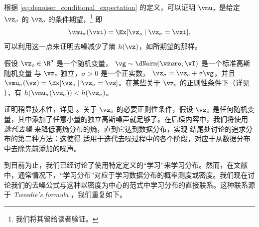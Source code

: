 \documentclass[../../book-main.tex]{subfiles}
\begin{document}
根据 \eqref{eq:denoiser_conditional_expectation} 的定义，可以证明 \(\vmu_{\sigma}\) 是给定 \(\vz_{\sigma}\) 的 \(\vz_{o}\) 的条件期望，\footnote{我们将其留给读者验证。} 即
\begin{equation}
    \vmu_{\sigma}(\vxi) = \Ex[\vz_{o} \mid \vz_{\sigma} = \vxi].
\end{equation}
可以利用这一点来证明去噪减少了熵 \(h(\vz)\)，如所期望的那样。
\begin{theorem}[去噪和熵]\label{thm:conditioning_reduces_entropy}
    假设 \(\vz_{o} \in \R^{d}\) 是一个随机变量，
    \(\vg \sim \dNorm(\vzero, \vI)\) 是一个标准高斯随机变量
    与 \(\vz_{o}\) 独立，\(\sigma > 0\) 是一个正实数，
    \(\vz_{\sigma} = \vz_{o} + \sigma \vg\)，并且 \(\vmu_{\sigma}(\vz)
    = \Ex[\vz_{o} \mid \vz_{\sigma} = \vz]\)。在某些关于 \(\vz_o\) 的正则性条件下（详见 ），有
    \(h(\vmu_{\sigma}(\vz_{\sigma})) < h(\vz_{\sigma})\)。
\end{theorem}
证明稍显技术性，详见 。关于 \(\vz_o\) 的必要正则性条件，假设 \(\vz_o\) 是任何随机变量，其中添加了任意小量的独立高斯噪声就足够了。在后续内容中，我们将使用 \textit{迭代去噪} 来降低高熵分布的熵，直到它达到数据分布，实现  结尾处讨论的追求分布的第二种方法：这使得  适用于迭代去噪过程中的各个阶段，对应于从数据分布中去除先前添加的噪声。

到目前为止，我们已经讨论了使用特定定义的“学习”来学习分布。然而，在文献中，通常情况下，“学习分布”对应于学习数据分布的概率测度或密度。我们现在讨论我们的去噪公式与这种以密度为中心的范式中学习分布的直接联系。这种联系源于 \textit{Tweedie's formula} \cite{Robbins1956AnEB}，我们重复如下。
\end{document}
